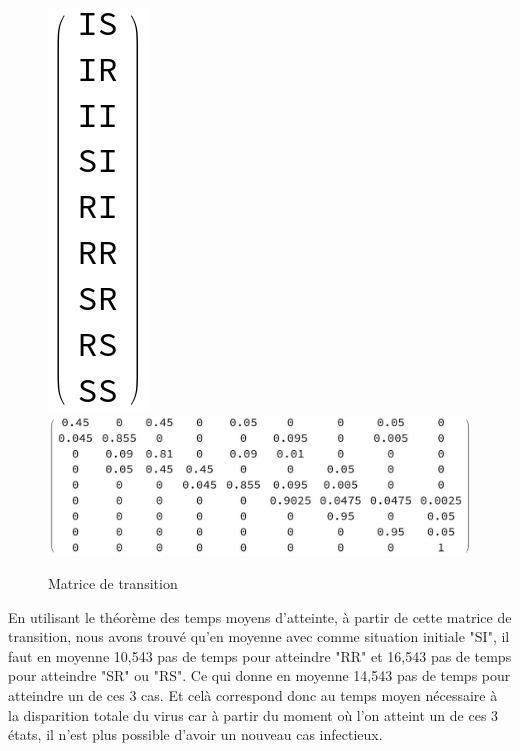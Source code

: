 \documentclass[a4paper, 11pt, oneside]{article}
\begin{document}
\begin{figure}[h]
    \centering
    \\
    \includegraphics[scale=0.5]{ordre_matrice_transitionQ4.jpg}
    \includegraphics[scale=0.5]{matriceTansition_Q4.jpg}
    \caption{Matrice de transition}
\end{figure}
En utilisant le théorème des temps moyens d'atteinte, à partir de cette 
matrice de transition, nous avons trouvé qu'en moyenne avec comme situation initiale 
"SI", il faut en moyenne 10,543 pas de temps pour atteindre "RR" et 16,543 pas 
de temps pour atteindre "SR" ou "RS". Ce qui donne en moyenne 14,543 pas de temps pour atteindre 
un de ces 3 cas. Et celà correspond donc au temps moyen nécessaire à la disparition  totale du virus car 
à partir du moment où l'on atteint un de ces 3 états, il n'est plus possible d'avoir un nouveau cas 
infectieux.
\end{document}
